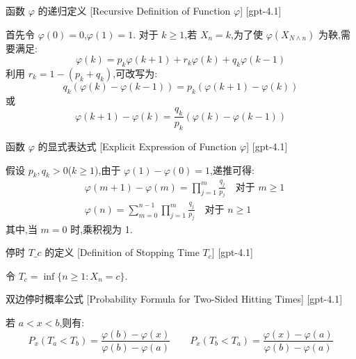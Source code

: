 \documentclass[UTF8]{ctexart}
\begin{document}
    
    
    \begin{dfn}
        {函数 $\varphi$ 的递归定义}
        [Recursive Definition of Function $\varphi$]
        [gpt-4.1]
        
首先令 $\varphi(0) = 0$,$\varphi(1) = 1$.
对于 $k \geq 1$,若 $X_n = k$,为了使 $\varphi(X_{N \wedge n})$ 为鞅,需要满足:
\[
\varphi(k) = p_k \varphi(k+1) + r_k \varphi(k) + q_k \varphi(k-1)
\]
利用 $r_k = 1 - (p_k + q_k)$,可改写为:
\[
q_k (\varphi(k) - \varphi(k-1)) = p_k (\varphi(k+1) - \varphi(k))
\]
或
\[
\varphi(k+1) - \varphi(k) = \frac{q_k}{p_k} (\varphi(k) - \varphi(k-1))
\]

    \end{dfn}
    
    
    
    \begin{dfn}
        {函数 $\varphi$ 的显式表达式}
        [Explicit Expression of Function $\varphi$]
        [gpt-4.1]
        
假设 $p_k, q_k > 0$($k \geq 1$),由于 $\varphi(1)-\varphi(0)=1$,递推可得:
\[
\begin{aligned}
& \varphi(m+1)-\varphi(m)=\prod_{j=1}^{m} \frac{q_j}{p_j} \quad \text{对于 } m \geq 1 \\
& \varphi(n)=\sum_{m=0}^{n-1} \prod_{j=1}^{m} \frac{q_j}{p_j} \quad \text{对于 } n \geq 1
\end{aligned}
\]
其中,当 $m=0$ 时,乘积视为 1.

    \end{dfn}
    
    
    
    \begin{dfn}
        {停时 $T\_c$ 的定义}
        [Definition of Stopping Time $T_c$]
        [gpt-4.1]
        
令 $T_c = \inf\{ n \geq 1 : X_n = c \}$.

    \end{dfn}
    
    
    
    \begin{thm}
        {双边停时概率公式}
        [Probability Formula for Two-Sided Hitting Times]
        [gpt-4.1]
        
若 $a < x < b$,则有:
\[
P_x(T_a < T_b) = \frac{\varphi(b) - \varphi(x)}{\varphi(b) - \varphi(a)} \qquad P_x(T_b < T_a) = \frac{\varphi(x) - \varphi(a)}{\varphi(b) - \varphi(a)}
\]

    \end{thm}
    
\end{document}
